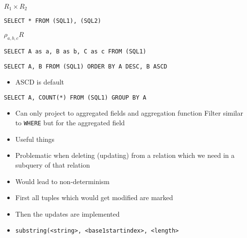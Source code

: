 \begin{itemize}
\begin{itemize}
             $R_1 \times R_2$
\begin{verbatim}
SELECT * FROM (SQL1), (SQL2)
\end{verbatim}
             $\rho_{a, b, c}R$
\begin{verbatim}
SELECT A as a, B as b, C as c FROM (SQL1)
\end{verbatim}
        \end{itemize}
\begin{verbatim}
SELECT A, B FROM (SQL1) ORDER BY A DESC, B ASCD
\end{verbatim}
        \begin{itemize}
            \item ASCD is default
        \end{itemize}
\begin{verbatim}
SELECT A, COUNT(*) FROM (SQL1) GROUP BY A
\end{verbatim}
        \begin{itemize}
            \item Can only project to aggregated fields and aggregation function
                 Filter similar to \verb+WHERE+ but for the aggregated field
        \end{itemize}
        \begin{itemize}
            \item Useful things
        \end{itemize}
        \begin{itemize}
            \item Problematic when deleting (updating) from a relation which we need in a subquery of that relation
            \item Would lead to non-determinism
            \item First all tuples which would get modified are marked
            \item Then the updates are implemented
        \end{itemize}
\end{itemize}

\begin{itemize}
    \item \verb+substring(<string>, <base1startindex>, <length>+
\end{itemize}
